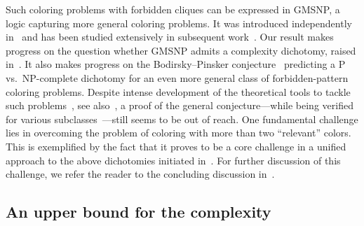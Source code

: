 \documentclass[oneside]{amsart}
\begin{document}
Such coloring problems with forbidden cliques can be expressed in GMSNP, a logic capturing more general coloring problems. It was introduced independently in~\cite{OBDA,MMSNP2} and has been studied extensively in subsequent work~\cite{Containment,GoldenPath,MinimalFiniteFactors,ExtensionalESO,BarsukovMadelaine,ASNP, Bitter,Feller,ForbTournaments}. Our result makes progress on the question whether GMSNP admits a complexity dichotomy, raised in~\cite{OBDA}.
It also makes progress on the Bodirsky--Pinsker 
conjecture~\cite{Conjecture} predicting a P vs.\ NP-complete dichotomy for an even more general class of forbidden-pattern coloring problems.
Despite intense development of the theoretical tools to tackle such problems~\cite{CoresRamsey,SmoothApproximations,Wonderland,TopologicalBirkhoff,DecidabilityDefinability,AntoineSampling,PPDefinitions,ExistenceCores,CSPsOrbitReduction,DecidabilityInterpretability}, see also~\cite{BodirskyBook}, a proof of the general conjecture---while being verified for various subclasses~\cite{EqualityCSPs,TemporalCSPs, PhyloCSPs, PosetCSPs, MMSNP, GraphSAT, homogeneousGraphCSPs, SmoothApproximations, ForbTournaments,Bitter,Feller,HypergraphCSP, RCC5}---still seems to be out of reach.
One fundamental challenge lies in overcoming the problem of coloring with more than two ``relevant'' colors. This is exemplified by the fact that it proves to be a core challenge in a unified approach to the above dichotomies initiated in~\cite{SmoothApproximations}.
For further discussion of this challenge, we refer the reader to the concluding discussion in~\cite{Feller}.


\subsection{An upper bound for the complexity}\label{subsection:hat_functor}
\end{document}
